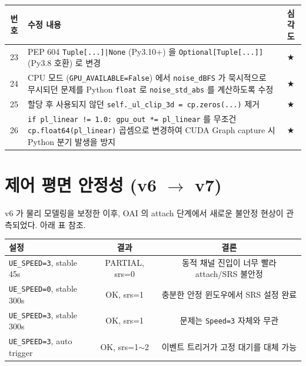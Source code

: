 \documentclass[11pt,a4paper]{article}
\newcommand{\sone}{\textcolor{starcolor}{$\bigstar$}}
\begin{document}
\begin{center}
\renewcommand{\arraystretch}{1.30}
\begin{tabular}{c p{8.4cm} c}
\toprule
\textbf{번호} & \textbf{수정 내용} & \textbf{심각도} \\
\midrule
23 & PEP 604 \texttt{Tuple[...]|None} (Py3.10+) 을
     \texttt{Optional[Tuple[...]]} (Py3.8 호환) 로 변경 & \sone \\
24 & CPU 모드 (\texttt{GPU\_AVAILABLE=False}) 에서 \texttt{noise\_dBFS}
     가 묵시적으로 무시되던 문제를 Python \texttt{float} 로
     \texttt{noise\_std\_abs} 를 계산하도록 수정 & \sone \\
25 & 할당 후 사용되지 않던 \texttt{self.\_ul\_clip\_3d = cp.zeros(...)} 제거 & \sone \\
26 & \texttt{if pl\_linear != 1.0: gpu\_out *= pl\_linear} 를
     무조건 \texttt{cp.float64(pl\_linear)} 곱셈으로 변경하여
     CUDA Graph capture 시 Python 분기 발생을 방지 & \sone \\
\bottomrule
\end{tabular}
\end{center}

\section{제어 평면 안정성 (v6 $\to$ v7)}
\label{sec:control}

v6 가 물리 모델링을 보정한 이후, OAI 의 attach 단계에서 새로운 불안정 현상이
관측되었다. 아래 표 참조.

\begin{center}
\renewcommand{\arraystretch}{1.25}
\begin{tabular}{l c c}
\toprule
\textbf{설정} & \textbf{결과} & \textbf{결론} \\
\midrule
\texttt{UE\_SPEED=3}, stable 45s   & PARTIAL, srs=0   & 동적 채널 진입이 너무 빨라 attach/SRS 불안정 \\
\texttt{UE\_SPEED=0}, stable 300s  & OK, srs=1        & 충분한 안정 윈도우에서 SRS 설정 완료 \\
\texttt{UE\_SPEED=3}, stable 300s  & OK, srs=1        & 문제는 \texttt{Speed=3} 자체와 무관 \\
\texttt{UE\_SPEED=3}, auto trigger & OK, srs=1$\sim$2 & 이벤트 트리거가 고정 대기를 대체 가능 \\
\bottomrule
\end{tabular}
\end{center}
\end{document}

